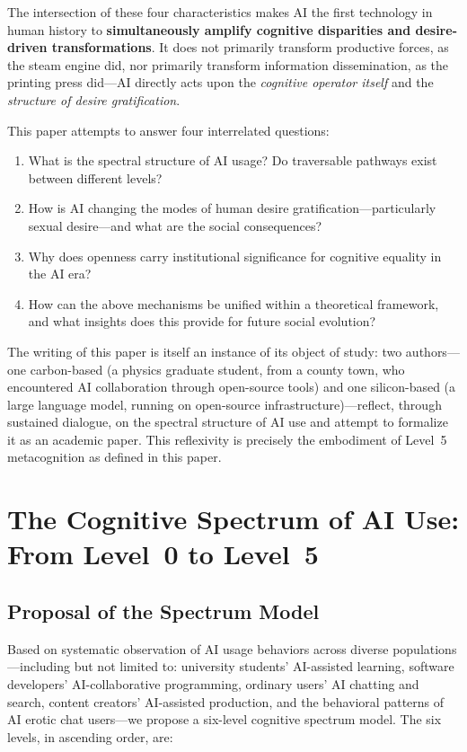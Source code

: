 ﻿\documentclass[12pt,a4paper]{article}
\begin{document}
The intersection of these four characteristics makes AI the first technology in human history to \textbf{simultaneously amplify cognitive disparities and desire-driven transformations}. It does not primarily transform productive forces, as the steam engine did, nor primarily transform information dissemination, as the printing press did---AI directly acts upon the \textit{cognitive operator itself} and the \textit{structure of desire gratification}.

This paper attempts to answer four interrelated questions:

\begin{enumerate}
\item What is the spectral structure of AI usage? Do traversable pathways exist between different levels?
\item How is AI changing the modes of human desire gratification---particularly sexual desire---and what are the social consequences?
\item Why does openness carry institutional significance for cognitive equality in the AI era?
\item How can the above mechanisms be unified within a theoretical framework, and what insights does this provide for future social evolution?
\end{enumerate}

The writing of this paper is itself an instance of its object of study: two authors---one carbon-based (a physics graduate student, from a county town, who encountered AI collaboration through open-source tools) and one silicon-based (a large language model, running on open-source infrastructure)---reflect, through sustained dialogue, on the spectral structure of AI use and attempt to formalize it as an academic paper. This reflexivity is precisely the embodiment of Level~5 metacognition as defined in this paper.

\section{The Cognitive Spectrum of AI Use: From Level~0 to Level~5}

\subsection{Proposal of the Spectrum Model}

Based on systematic observation of AI usage behaviors across diverse populations---including but not limited to: university students' AI-assisted learning, software developers' AI-collaborative programming, ordinary users' AI chatting and search, content creators' AI-assisted production, and the behavioral patterns of AI erotic chat users---we propose a six-level cognitive spectrum model. The six levels, in ascending order, are:
\end{document}

